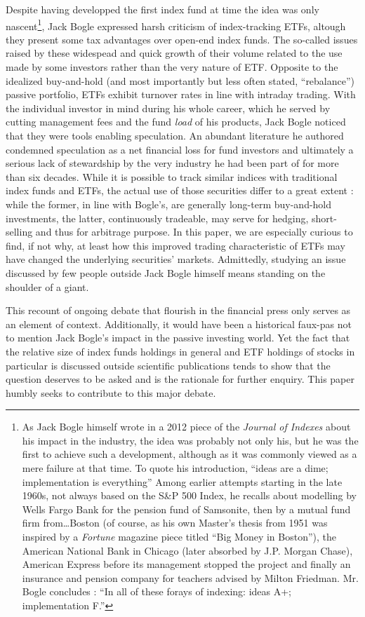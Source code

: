 Despite having developped the first index fund at time the idea was only nascent\footnote{As Jack Bogle himself wrote in a 2012 piece of the \textit{Journal of Indexes} about his impact in the industry, the idea was probably not only his, but he was the first to achieve such a development, although as it was commonly viewed as a mere failure at that time. To quote his introduction, ``ideas are a dime; implementation is everything'' Among earlier attempts starting in the late 1960s, not always based on the S\&P 500 Index, he recalls about modelling by Wells Fargo Bank for the pension fund of Samsonite, then by a mutual fund firm from\dots Boston (of course, as his own Master's thesis from 1951 was inspired by a \textit{Fortune} magazine piece titled ``Big Money in Boston''), the American National Bank in Chicago (later absorbed by J.P. Morgan Chase), American Express before its management stopped the project and finally an insurance and pension company for teachers advised by Milton Friedman. Mr. Bogle concludes : ``In all of these forays of indexing: ideas A+; implementation F.''}, Jack Bogle expressed harsh criticism of index-tracking ETFs, altough they present some tax advantages over open-end index funds. The so-called issues raised by these widespead and quick growth of their volume related to the use made by some investors rather than the very nature of ETF. Opposite to the idealized buy-and-hold (and most importantly but less often stated, ``rebalance'') passive portfolio, ETFs exhibit turnover rates in line with intraday trading. With the individual investor in mind during his whole career, which he served by cutting management fees and the fund \textit{load} of his products, Jack Bogle noticed that they were tools enabling speculation. An abundant literature he authored condemned speculation as a net financial loss for fund investors and ultimately a serious lack of stewardship by the very industry he had been part of for more than six decades. While it is possible to track similar indices with traditional index funds and ETFs, the actual use of those securities differ to a great extent : while the former, in line with Bogle's, are generally long-term buy-and-hold investments, the latter, continuously tradeable, may serve for hedging, short-selling and thus for arbitrage purpose. In this paper, we are especially curious to find, if not why, at least how this improved trading characteristic of ETFs may have changed the underlying securities' markets. Admittedly, studying an issue discussed by few people outside Jack Bogle himself means standing on the shoulder of a giant.

This recount of ongoing debate that flourish in the financial press only serves as an element of context. Additionally, it would have been a historical faux-pas not to mention Jack Bogle's impact in the passive investing world. Yet the fact that the relative size of index funds holdings in general and ETF holdings of stocks in particular is discussed outside scientific publications tends to show that the question deserves to be asked and is the rationale for further enquiry. This paper humbly seeks to contribute to this major debate. 

